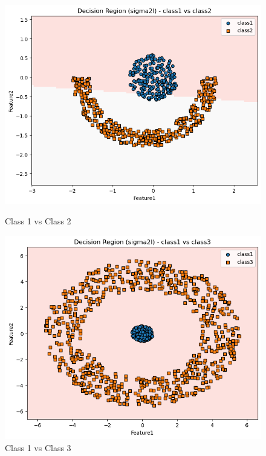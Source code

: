 \begin{figure}[H]
    \centering
    \begin{minipage}{0.32\linewidth}
        \includegraphics[width=\linewidth]{images/NLS_Group04_images/01_sigma2i/02_decision_region_c1_c2.png}
        \caption*{Class 1 vs Class 2}
    \end{minipage}
    \hfill
    \begin{minipage}{0.32\linewidth}
        \includegraphics[width=\linewidth]{images/NLS_Group04_images/01_sigma2i/03_decision_region_c1_c3.png}
        \caption*{Class 1 vs Class 3}
    \end{minipage}
    \hfill
    \begin{minipage}{0.32\linewidth}

\end{minipage}
\end{figure}
